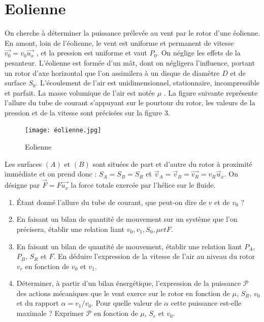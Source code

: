 \documentclass{article}
\begin{document}
\section{Eolienne}

  On cherche à déterminer la puissance prélevée au vent par le rotor d’une éolienne. En amont,
loin de l’éolienne, le vent est uniforme et permanent de vitesse $\vec{v_0} = v_0 \vec{u_x}$ , et la pression
est uniforme et vaut $P_0$. On néglige les effets de la pesanteur. L'éolienne est formée d’un mât, dont on négligera
 l’influence, portant un rotor d’axe horizontal que l’on assimilera à un
disque de diamètre $D$ et de surface $S_0$. 
L’écoulement de l’air est unidimensionnel, stationnaire, incompressible et parfait. La masse volumique de l’air est notée $\mu$ .
La figure suivante représente l’allure du tube de courant s’appuyant sur le pourtour du rotor,
les valeurs de la pression et de la vitesse sont précisées sur la figure 3.

\begin{figure}[h]
  \centering
  \texttt{[image: éolienne.jpg]}
  \caption{Eolienne}
  \label{fig:eolienne}
\end{figure}

Les surfaces $(A)$ et $(B)$ sont situées de part et d’autre du rotor à proximité immédiate et on
prend donc : $S_A = S_B = S_R$ et $\vec{v}_{A}=\vec{v}_{B}=\vec{v_R}=v_{R}\vec{u}_{x}$. 
On désigne par $\vec{F} = F\vec{u_x}$ la force
totale exercée par l’hélice sur le fluide.
\begin{enumerate}
  \item Étant donné l’allure du tube de courant, que peut-on dire de $v$ et de $v_0$ ?
  \item En faisant un bilan de quantité de mouvement sur un système que l’on précisera, établir
  une relation liant $v_0, v_1, S_0, \mu et F $. 
  \item  En faisant un bilan de quantité de mouvement, établir une relation liant $P_A$,$  P_B$, $S_R$ et $F$. En
  déduire l’expression de la vitesse de l’air au niveau du rotor $v_r$ en fonction de $v_0$ et $v_1$.
  \item Déterminer, à partir d’un bilan énergétique, l’expression de la puissance $\mathcal{P}$ des actions
  mécaniques que le vent exerce sur le rotor en fonction de $\mu$, $S_R$, $v_0$ et du rapport $\alpha = v_1/v_0$.
  Pour quelle valeur de $\alpha$ cette puissance est-elle maximale ? Exprimer $\mathcal{P}$  en fonction de $\mu$, $S_r$ et $v_0$. 
\end{enumerate}
\end{document}
